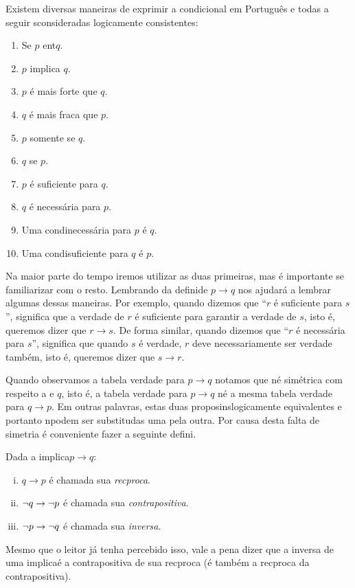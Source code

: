 Existem diversas maneiras de exprimir a condicional em Portugu\^es e todas a seguir s\ao consideradas logicamente consistentes:
\begin{enumerate}[{\bf a)}]
\item Se $p$ ent\ao $q$.
\item $p$ implica $q$.
\item $p$ \'e mais forte que $q$.
\item $q$ \'e mais fraca que $p$.
\item $p$ somente se $q$.
\item $q$ se $p$.
\item $p$ \'e suficiente para $q$.
\item $q$ \'e necess\'aria para $p$.
\item Uma condi\cao necess\'aria para $p$ \'e $q$.
\item Uma condi\cao suficiente para $q$ \'e $p$.
\end{enumerate}
Na maior parte do tempo iremos utilizar as duas primeiras, mas \'e importante se familiarizar com o resto. Lembrando da defini\cao de $p \to q$ nos ajudar\'a a lembrar algumas dessas maneiras. Por exemplo, quando dizemos que ``$r$ \'e suficiente para $s$'', significa que a verdade de $r$ \'e suficiente para garantir a verdade de $s$, isto \'e, queremos dizer que $r \to s$. De forma similar, quando dizemos que ``$r$ \'e necess\'aria para $s$'', significa que quando $s$ \'e verdade, $r$ deve necessariamente ser verdade tamb\'em, isto \'e, queremos dizer que $s\to r$. 

Quando observamos a tabela verdade para $p \to q$ notamos que n\ao \'e sim\'etrica com respeito a \pp e $q$, isto \'e, a tabela verdade para $p \to q$ n\ao \'e a mesma tabela verdade para $q\to p$. Em outras palavras, estas duas proposi\coes n\ao s\ao logicamente equivalentes e portanto n\ao podem ser substitu\ih das uma pela outra. Por causa desta falta de simetria \'e conveniente fazer a seguinte defini\caoi.

Dada a implica\cao $p \to q$:
\begin{enumerate}[i)]
\item $q \to p$ \'e chamada sua \emph{rec\ih proca}. 
\item $\lnot q \to \lnot p$ \'e chamada sua \emph{contrapositiva}. 
\item $\lnot p \to \lnot q$ \'e chamada sua \emph{inversa}. 
\end{enumerate}
Mesmo que o leitor j\'a tenha percebido isso, vale a pena dizer que a inversa de uma implica\cao \'e a contrapositiva de sua rec\ih proca (\'e tamb\'em a rec\ih proca da contrapositiva).

